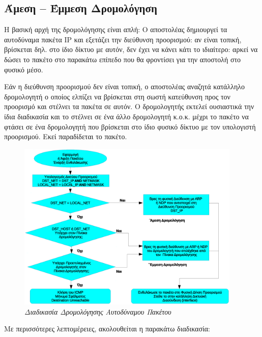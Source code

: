 %
%
\subsection{Άμεση -- Έμμεση Δρομολόγηση}

Η βασική αρχή της δρομολόγησης είναι απλή: Ο αποστολέας δημιουργεί τα αυτοδύναμα πακέτα IP και εξετάζει την διεύθυνση προορισμού: αν είναι τοπική, βρίσκεται δηλ. στο ίδιο δίκτυο με αυτόν, δεν έχει να κάνει κάτι το ιδιαίτερο: αρκεί να δώσει το πακέτο στο παρακάτω επίπεδο που θα φροντίσει για την αποστολή στο φυσικό μέσο.  

Εάν η διεύθυνση προορισμού δεν είναι τοπική, ο αποστολέας αναζητά κατάλληλο δρομολογητή ο οποίος ελπίζει να βρίσκεται στη σωστή κατεύθυνση  προς τον προορισμό και στέλνει τα  πακέτα σε αυτόν.  Ο δρομολογητής εκτελεί ουσιαστικά την ίδια διαδικασία και το στέλνει σε ένα άλλο δρομολογητή κ.ο.κ. μέχρι το πακέτο να φτάσει σε ένα δρομολογητή που βρίσκεται στο ίδιο φυσικό δίκτυο με τον υπολογιστή προορισμού. Εκεί παραδίδεται το πακέτο.

\begin{figure}[!ht]
 \centering
 \includegraphics[width=0.95\textwidth]{images/chapter3/3-21}
 \caption {\textsl{Διαδικασία Δρομολόγησης Αυτοδύναμου Πακέτου}}
 \label{3-21}
\end{figure}


Με περισσότερες λεπτομέρειες, ακολουθείται η παρακάτω διαδικασία:

